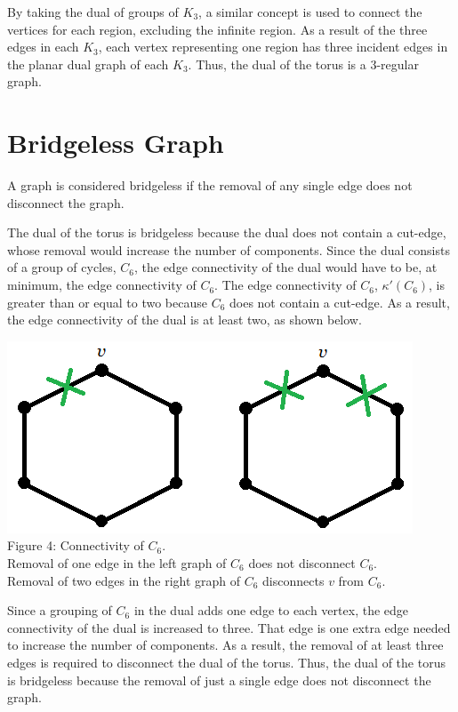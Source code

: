 \documentclass[12pt]{article}
\begin{document}
\begin{flushleft}
\medskip
By taking the dual of groups of $K_3$, a similar concept is used to connect the vertices for each region, excluding the infinite region. As a result of the three edges in each $K_3$, each vertex representing one region has three incident edges in the planar dual graph of each $K_3$. Thus, the dual of the torus is a 3-regular graph.

\section*{Bridgeless Graph}
A graph is considered bridgeless if the removal of any single edge does not disconnect the graph.

\medskip
The dual of the torus is bridgeless because the dual does not contain a cut-edge, whose removal would increase the number of components. Since the dual consists of a group of cycles, $C_6$, the edge connectivity of the dual would have to be, at minimum, the edge connectivity of $C_6$. The edge connectivity of $C_6$, $\kappa'(C_6)$, is greater than or equal to two because $C_6$ does not contain a cut-edge. As a result, the edge connectivity of the dual is at least two, as shown below.

\begin{center}
\includegraphics[scale=1]{images/c6connectivity.png}\\
Figure 4: Connectivity of $C_6$.\\
Removal of one edge in the left graph of $C_6$ does not disconnect $C_6$.\\
Removal of two edges in the right graph of $C_6$ disconnects $v$ from $C_6$.
\end{center}

\medskip
Since a grouping of $C_6$ in the dual adds one edge to each vertex, the edge connectivity of the dual is increased to three. That edge is one extra edge needed to increase the number of components. As a result, the removal of at least three edges is required to disconnect the dual of the torus. Thus, the dual of the torus is bridgeless because the removal of just a single edge does not disconnect the graph.


\end{flushleft}
\end{document}
